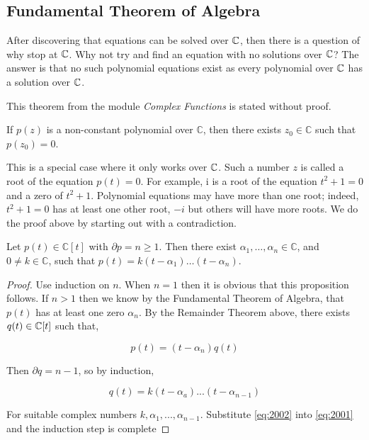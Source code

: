 



\subsection{Fundamental Theorem of Algebra} 

After discovering that equations can be solved over $\mathbb C$, then there is a question of why stop at $\mathbb C$. Why not try and find an equation with no solutions over $\mathbb C$? The answer is that no such polynomial equations exist as every polynomial over $\mathbb C$ has a solution over $\mathbb C$.

This theorem from the module \textit{Complex Functions} is stated without proof. 

\begin{theorem} \label{thm:fundamental-algebra}
    If $p(z)$ is a non-constant polynomial over $\mathbb{C}$, then there exists $z_0 \in \mathbb{C}$ such that $p\left(z_0\right)=0$.
\end{theorem}

This is a special case where it only works over $\mathbb C$. Such a number $z$ is called a root of the equation $p(t)=0$. For example, $\mathrm{i}$ is a root of the equation $t^2+1=0$ and a zero of $t^2+1$. Polynomial equations may have more than one root; indeed, $t^2+1=0$ has at least one other root, $-i$ but others will have more roots. We do the proof above by starting out with a contradiction.

\begin{proposition}
    Let $p(t) \in \mathbb{C}[t]$ with $\partial p=n \geq 1$. Then there exist $\alpha_1, \ldots, \alpha_n \in \mathbb{C}$, and $0 \neq k \in \mathbb{C}$, such that
    $
    p(t)=k\left(t-\alpha_1\right) \ldots\left(t-\alpha_n\right).
    $
\end{proposition}

\begin{proof}
    Use induction on $n$. When $n = 1$ then it is obvious that this proposition follows. If $n > 1$ then we know by the Fundamental Theorem of Algebra, that $p(t)$ has at least one zero $\alpha_n$. By the Remainder Theorem above, there exists $q(t) \in \mathbb C[t]$ such that,

\begin{equation} \label{eq:2001}
    p(t) = (t-\alpha_n) q(t)
\end{equation}
    
    Then $\partial q = n - 1$, so by induction,

\begin{equation} \label{eq:2002}
    q(t) = k(t-\alpha_a)...(t-\alpha_{n-1})
\end{equation}     
    
    For suitable complex numbers $k,\alpha_1,...,\alpha_{n-1}$. Substitute \ref{eq:2002} into \ref{eq:2001} and the induction step is complete
\end{proof}

